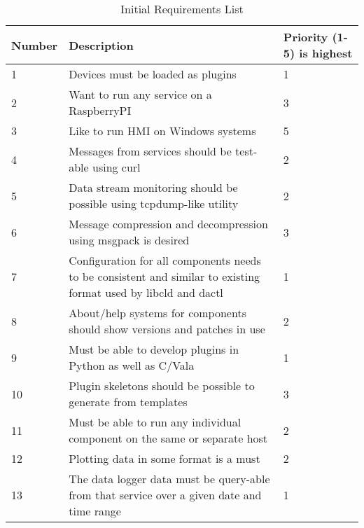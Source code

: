     \begin{table}[H]
      \centering
      \begin{tabular}{l p{11cm} p{3cm}}
        \toprule
        Number & Description & Priority (1-5)\newline 1 is highest \\ [0.5ex]
        \midrule
         1 & Devices must be loaded as plugins & 1 \\
         2 & Want to run any service on a RaspberryPI & 3 \\
         3 & Like to run HMI on Windows systems & 5 \\
         4 & Messages from services should be test-able using curl & 2 \\
         5 & Data stream monitoring should be possible using tcpdump-like utility & 2 \\
         6 & Message compression and decompression using msgpack is desired & 3 \\
         7 & Configuration for all components needs to be consistent and similar to existing format used by libcld and dactl & 1 \\
         8 & About/help systems for components should show versions and patches in use & 2 \\
         9 & Must be able to develop plugins in Python as well as C/Vala & 1 \\
        10 & Plugin skeletons should be possible to generate from templates & 3 \\
        11 & Must be able to run any individual component on the same or separate host & 2 \\
        12 & Plotting data in some format is a must & 2 \\
        13 & The data logger data must be query-able from that service over a given date and time range & 1 \\
        \bottomrule
      \end{tabular}
      \caption{Initial Requirements List}\label{tab:requirements}
    \end{table}

